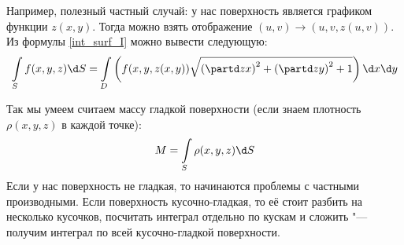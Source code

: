 Например, полезный частный случай: у нас поверхность является графиком функции $z(x, y)$.
Тогда можно взять отображение $(u, v) \to (u, v, z(u, v))$.
Из формулы \ref{int_surf_I} можно вывести следующую:
\begin{equation}\label{int_surf_I_graph}
	\int\limits_{S} f(x, y, z) \d S = \int\limits_D \left( f(x, y, z(x, y)) \sqrt{\left(\partd z x\right)^2+\left(\partd z y\right)^2+1} \right) \d x \d y
\end{equation}

Так мы умеем считаем массу гладкой поверхности (если знаем плотность $\rho(x, y, z)$ в каждой точке):
\[ M = \int\limits_S \rho(x, y, z) \d S \]
Если у нас поверхность не гладкая, то начинаются проблемы с частными производными.
Если поверхность кусочно-гладкая, то её стоит разбить на несколько кусочков, посчитать интеграл отдельно
по кускам и сложить "--- получим интеграл по всей кусочно-гладкой поверхности.

